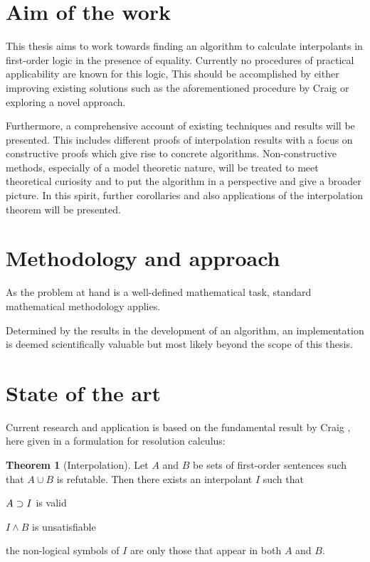 \documentclass[,%
			paper=a4,%
			DIV12,
			liststotoc,
			bibtotoc,
			draft=false,%
			numbers=noendperiod
			]{scrartcl}
\theoremstyle{definition}
\newtheorem{thm}{Theorem}
\begin{document}
\section{Aim of the work}

This thesis aims to work towards finding an algorithm to calculate interpolants in first-order logic in the presence of equality.
Currently no procedures of practical applicability are known for this logic,  
This should be accomplished by either improving existing solutions such as the aforementioned procedure by Craig or exploring a novel approach.

Furthermore, a comprehensive account of existing techniques and results will be presented.
This includes different proofs of interpolation results with a focus on constructive proofs which give rise to concrete algorithms.
Non-constructive methods, especially of a model theoretic nature, will be treated to meet theoretical curiosity and to put the algorithm in a perspective and give a broader picture.
In this spirit, further corollaries and also applications of the interpolation theorem will be presented.


\section{Methodology and approach}

As the problem at hand is a well-defined mathematical task, standard mathematical methodology applies.

Determined by the results in the development of an algorithm, an implementation is deemed scientifically valuable but most likely beyond the scope of this thesis.


\section{State of the art}

Current research and application is based on the fundamental result by Craig \cite{craig57linear}, here given in a formulation for resolution calculus:

\begin{thm}[Interpolation]
	Let $A$ and $B$ be sets of first-order sentences such that $A \cup B$ is refutable. 
	Then there exists an interpolant $I$ such that
	\begin{compactenum}
		\item $A \supset I$ is valid 
		\item $I \land B$ is unsatisfiable
		\item the non-logical symbols of $I$ are only those that appear in both $A$ and $B$.
	\end{compactenum}
\end{thm}
\end{document}
